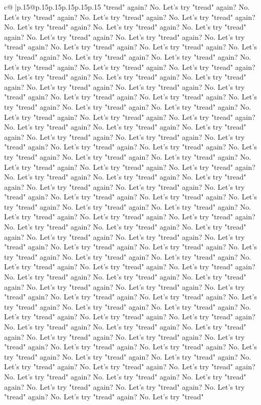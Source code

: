 \documentclass{article}
\begin{document}
{\begin{supertabular}{c@{$\;$}|p{.15\linewidth}@{}p{.15\linewidth}p{.15\linewidth}p{.15\linewidth}p{.15\linewidth}p{.15\linewidth}}
{{{"tread" again? No. Let's try "tread" again? No. Let's try "tread" again? No. Let's try "tread" again? No. Let's try "tread" again? No. Let's try "tread" again? No. Let's try "tread" again? No. Let's try "tread" again? No. Let's try "tread" again? No. Let's try "tread" again? No. Let's try "tread" again? No. Let's try "tread" again? No. Let's try "tread" again? No. Let's try "tread" again? No. Let's try "tread" again? No. Let's try "tread" again? No. Let's try "tread" again? No. Let's try "tread" again? No. Let's try "tread" again? No. Let's try "tread" again? No. Let's try "tread" again? No. Let's try "tread" again? No. Let's try "tread" again? No. Let's try "tread" again? No. Let's try "tread" again? No. Let's try "tread" again? No. Let's try "tread" again? No. Let's try "tread" again? No. Let's try "tread" again? No. Let's try "tread" again? No. Let's try "tread" again? No. Let's try "tread" again? No. Let's try "tread" again? No. Let's try "tread" again? No. Let's try "tread" again? No. Let's try "tread" again? No. Let's try "tread" again? No. Let's try "tread" again? No. Let's try "tread" again? No. Let's try "tread" again? No. Let's try "tread" again? No. Let's try "tread" again? No. Let's try "tread" again? No. Let's try "tread" again? No. Let's try "tread" again? No. Let's try "tread" again? No. Let's try "tread" again? No. Let's try "tread" again? No. Let's try "tread" again? No. Let's try "tread" again? No. Let's try "tread" again? No. Let's try "tread" again? No. Let's try "tread" again? No. Let's try "tread" again? No. Let's try "tread" again? No. Let's try "tread" again? No. Let's try "tread" again? No. Let's try "tread" again? No. Let's try "tread" again? No. Let's try "tread" again? No. Let's try "tread" again? No. Let's try "tread" again? No. Let's try "tread" again? No. Let's try "tread" again? No. Let's try "tread" again? No. Let's try "tread" again? No. Let's try "tread" again? No. Let's try "tread" again? No. Let's try "tread" again? No. Let's try "tread" again? No. Let's try "tread" again? No. Let's try "tread" again? No. Let's try "tread" again? No. Let's try "tread" again? No. Let's try "tread" again? No. Let's try "tread" again? No. Let's try "tread" again? No. Let's try "tread" again? No. Let's try "tread" again? No. Let's try "tread" again? No. Let's try "tread" again? No. Let's try "tread" again? No. Let's try "tread" again? No. Let's try "tread" again? No. Let's try "tread" again? No. Let's try "tread" again? No. Let's try "tread" again? No. Let's try "tread" again? No. Let's try "tread" again? No. Let's try "tread" again? No. Let's try "tread" again? No. Let's try "tread" again? No. Let's try "tread" again? No. Let's try "tread" again? No. Let's try "tread" again? No. Let's try "tread" again? No. Let's try "tread" again? No. Let's try "tread" again? No. Let's try "tread" again? No. Let's try "tread" again? No. Let's try "tread" again? No. Let's try "tread" again? No. Let's try "tread" again? No. Let's try "tread" again? No. Let's try "tread" again? No. Let's try "tread" again? No. Let's try "tread" again? No. Let's try "tread" again? No. Let's try "tread" again? No. Let's try "tread" again? No. Let's try "tread" }}}
\end{supertabular}}
\end{document}
